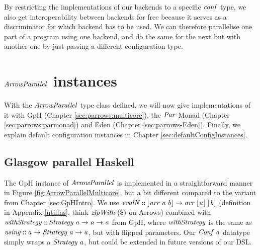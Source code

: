 \documentclass[paper=A4,twoside=true,openright,parskip=full,chapterprefix=true,headings=normal,bibliography=totoc,listof=totoc,titlepage=on,captions=tableabove,draft=false,british]{scrreprt}%
\begin{document}
By restricting the implementations of our backends to a specific \ensuremath{\Varid{conf}}
type, we also get interoperability between backends for free because it
serves as a discriminator for which backend has to be used. We can
therefore parallelise one part of a program using one backend, and do
the same for the next but with another one by just passing a different
configuration type.

\hypertarget{arrowparallel-instances}{%
\section{\texorpdfstring{\ensuremath{\Conid{ArrowParallel}}
instances}{ instances}}\label{arrowparallel-instances}}

\label{sec:arrowparallelimpl}

With the \ensuremath{\Conid{ArrowParallel}} type class defined, we will now give
implementations of it with GpH (Chapter \ref{sec:parrows:multicore}),
the \ensuremath{\Conid{Par}} Monad (Chapter \ref{sec:parrows:parmonad}) and Eden (Chapter
\ref{sec:parrows-Eden}). Finally, we explain default configuration
instances in Chapter \ref{sec:defaultConfigInstances}.

\hypertarget{glasgow-parallel-haskell}{%
\subsection{Glasgow parallel Haskell}\label{glasgow-parallel-haskell}}

\label{sec:parrows:multicore}

The GpH instance of \ensuremath{\Conid{ArrowParallel}} is implemented in a straightforward
manner in Figure \ref{fig:ArrowParallelMulticore}, but a bit different
compared to the variant from Chapter \ref{sec:GpHIntro}. We use
\ensuremath{\Varid{evalN}\mathbin{::}[\mskip1.5mu \Varid{arr}\;\Varid{a}\;\Varid{b}\mskip1.5mu]\to \Varid{arr}\;[\mskip1.5mu \Varid{a}\mskip1.5mu]\;[\mskip1.5mu \Varid{b}\mskip1.5mu]} (definition in Appendix
\ref{utilfns}, think \ensuremath{\Varid{zipWith}\;(\mathbin{\$})} on Arrows) combined with
\ensuremath{\Varid{withStrategy}\mathbin{::}\Conid{Strategy}\;\Varid{a}\to \Varid{a}\to \Varid{a}} from GpH, where \ensuremath{\Varid{withStrategy}} is
the same as \ensuremath{\Varid{using}\mathbin{::}\Varid{a}\to \Conid{Strategy}\;\Varid{a}\to \Varid{a}}, but with flipped
parameters. Our \ensuremath{\Conid{Conf}\;\Varid{a}} datatype simply wraps a \ensuremath{\Conid{Strategy}\;\Varid{a}}, but could
be extended in future versions of our DSL.
\end{document}
